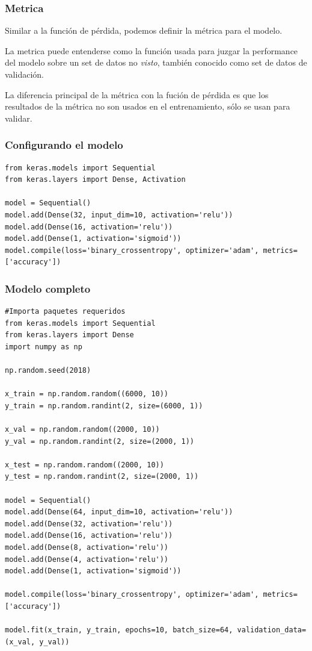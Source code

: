 \documentclass[9pt, xcolor=svgnames, dvipsnames]{beamer}
\begin{document}
\begin{frame}
\frametitle{Metrica}
Similar a la funci\'on de p\'erdida, podemos definir la m\'etrica para el modelo. 

\begin{tcolorbox}
La metrica puede entenderse como la funci\'on usada para juzgar la performance del modelo sobre un set de datos no \textit{visto}, tambi\'en conocido como set de datos de validaci\'on.
\end{tcolorbox}

La diferencia principal de la m\'etrica con la fuci\'on de p\'erdida es que los resultados de la m\'etrica no son usados en el entrenamiento, s\'olo se usan para validar.
\end{frame}


\begin{frame}[fragile]
\frametitle{Configurando el modelo}
\begin{verbatim}
from keras.models import Sequential
from keras.layers import Dense, Activation

model = Sequential()
model.add(Dense(32, input_dim=10, activation='relu'))
model.add(Dense(16, activation='relu'))
model.add(Dense(1, activation='sigmoid'))
model.compile(loss='binary_crossentropy', optimizer='adam', metrics=['accuracy'])

\end{verbatim}
\end{frame}

\begin{frame}[fragile]
\frametitle{Modelo completo}
\begin{verbatim}
#Importa paquetes requeridos
from keras.models import Sequential
from keras.layers import Dense
import numpy as np

np.random.seed(2018)

x_train = np.random.random((6000, 10))
y_train = np.random.randint(2, size=(6000, 1))

x_val = np.random.random((2000, 10))
y_val = np.random.randint(2, size=(2000, 1))

x_test = np.random.random((2000, 10))
y_test = np.random.randint(2, size=(2000, 1))

model = Sequential()
model.add(Dense(64, input_dim=10, activation='relu'))
model.add(Dense(32, activation='relu'))
model.add(Dense(16, activation='relu'))
model.add(Dense(8, activation='relu'))
model.add(Dense(4, activation='relu'))
model.add(Dense(1, activation='sigmoid'))

model.compile(loss='binary_crossentropy', optimizer='adam', metrics=['accuracy'])

model.fit(x_train, y_train, epochs=10, batch_size=64, validation_data=(x_val, y_val))
\end{verbatim}
\end{frame}
\end{document}

